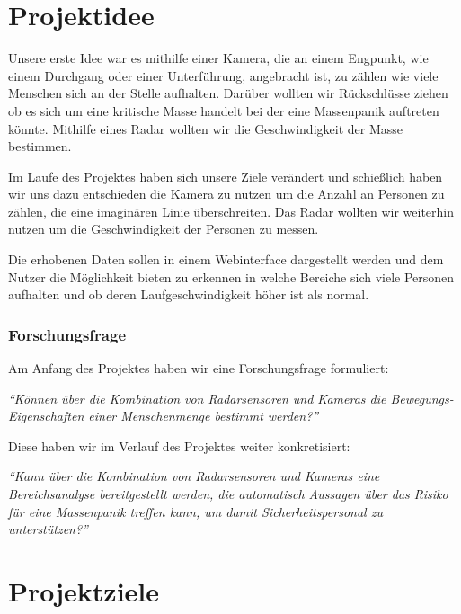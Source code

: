\documentclass[report]{scrartcl}
\begin{document}
\thispagestyle{empty}
\newpage
\setcounter{page}{1}

\part{Projektidee}


Unsere erste Idee war es mithilfe einer Kamera, die an einem Engpunkt, wie
einem Durchgang oder einer Unterführung, angebracht ist, zu zählen wie viele
Menschen sich an der Stelle aufhalten. Darüber wollten wir Rückschlüsse ziehen
ob es sich um eine kritische Masse handelt bei der eine Massenpanik auftreten
könnte. Mithilfe eines Radar wollten wir die Geschwindigkeit der Masse
bestimmen.

Im Laufe des Projektes haben sich unsere Ziele verändert und schießlich haben
wir uns dazu entschieden die Kamera zu nutzen um die Anzahl an Personen zu
zählen, die eine imaginären Linie überschreiten. Das Radar wollten wir
weiterhin nutzen um die Geschwindigkeit der Personen zu messen.

Die erhobenen Daten sollen in einem Webinterface dargestellt werden und dem
Nutzer die Möglichkeit bieten zu erkennen in welche Bereiche sich viele
Personen aufhalten und ob deren Laufgeschwindigkeit höher ist als normal.

\section{Forschungsfrage}


Am Anfang des Projektes haben wir eine Forschungsfrage formuliert:

\textit{``Können über die Kombination von Radarsensoren und Kameras die
  Bewegungs-Eigenschaften einer Menschenmenge bestimmt werden?''}

Diese haben wir im Verlauf des Projektes weiter konkretisiert:

\textit{``Kann über die Kombination von Radarsensoren und Kameras eine
  Bereichsanalyse bereitgestellt werden, die automatisch Aussagen über das Risiko
  für eine Massenpanik treffen kann, um damit Sicherheitspersonal zu
  unterstützen?''}

\part{Projektziele}
\end{document}
